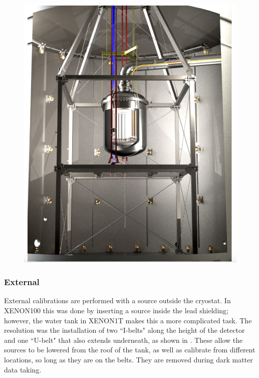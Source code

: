 \begin{figure}
\centering
\includegraphics[width=\textwidth]{WaterTankInside}
\label{fig:water_tank_inside}
\end{figure}



\subsubsection{External}
\label{subsubsec:xenon1t_calibrations_external}
External calibrations are performed with a source outside the cryostat.  In XENON100 this was done by inserting a source inside the lead
shielding; however, the water tank in XENON1T makes this a more complicated task.  The resolution was the installation of two ``I-belts"
along the height of the detector and one ``U-belt" that also extends underneath, as shown in .  These
allow the sources to be lowered from the roof of the tank, as well as calibrate from different locations, so long as they are on the
belts.  They are removed during dark matter data taking.

